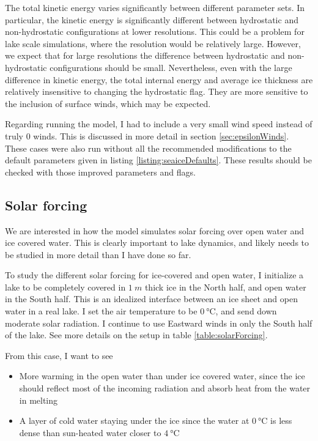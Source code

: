 \documentclass[11pt]{article}
\begin{document}
The total kinetic energy varies significantly between different parameter sets. In particular, the kinetic energy is significantly different between hydrostatic and non-hydrostatic configurations at lower resolutions. This could be a problem for lake scale simulations, where the resolution would be relatively large. However, we expect that for large resolutions the difference between hydrostatic and non-hydrostatic configurations should be small. Nevertheless, even with the large difference in kinetic energy, the total internal energy and average ice thickness are relatively insensitive to changing the hydrostatic flag. They are more sensitive to the inclusion of surface winds, which may be expected.

Regarding running the model, I had to include a very small wind speed instead of truly 0 winds. This is discussed in more detail in section \ref{sec:epsilonWinds}. These cases were also run without all the recommended modifications to the default parameters given in listing \ref{listing:seaiceDefaults}. These results should be checked with those improved parameters and flags.

\subsection{Solar forcing}
We are interested in how the model simulates solar forcing over open water and ice covered water. This is clearly important to lake dynamics, and likely needs to be studied in more detail than I have done so far.

To study the different solar forcing for ice-covered and open water, I initialize a lake to be completely covered in $\SI{1}{m}$ thick ice in the North half, and open water in the South half. This is an idealized interface between an ice sheet and open water in a real lake. I set the air temperature to be $\SI{0}{\celsius}$, and send down moderate solar radiation. I continue to use Eastward winds in only the South half of the lake. See more details on the setup in table \ref{table:solarForcing}.

From this case, I want to see
\begin{itemize}
\item{More warming in the open water than under ice covered water, since the ice should reflect most of the incoming radiation and absorb heat from the water in melting}
\item{A layer of cold water staying under the ice since the water at $\SI{0}{\celsius}$ is less dense than sun-heated water closer to $\SI{4}{\celsius}$}
\end{itemize}
\end{document}
